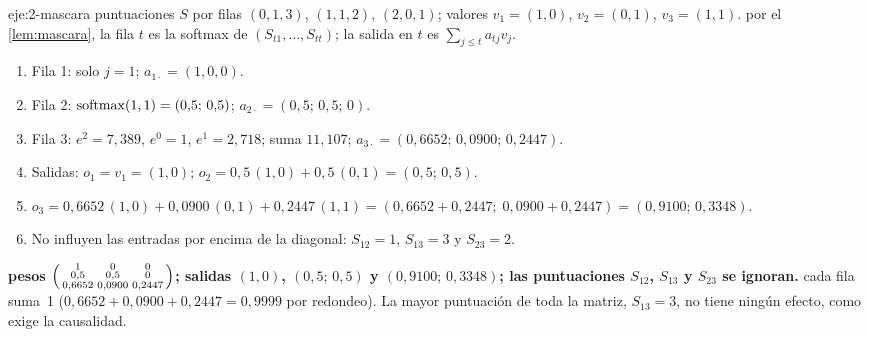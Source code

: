 \begin{solucion}{eje:2-mascara}
\datos puntuaciones $S$ por filas $(0,1,3)$, $(1,1,2)$, $(2,0,1)$; valores $v_1=(1,0)$, $v_2=(0,1)$, $v_3=(1,1)$.
\planteamiento por el \cref{lem:mascara}, la fila $t$ es la softmax de $(S_{t1},\dots,S_{tt})$; la salida en $t$ es $\sum_{j\le t}a_{tj}v_j$.
\pasos
\begin{enumerate}[label=\arabic*.]
  \item Fila 1: solo $j=1$; $a_{1\cdot}=(1,0,0)$.
  \item Fila 2: $\operatorname{softmax}(1,1)=(0{,}5;\allowbreak\,0{,}5)$; $a_{2\cdot}=(0{,}5;\allowbreak\,0{,}5;\allowbreak\,0)$.
  \item Fila 3: $e^{2}=7{,}389$, $e^{0}=1$, $e^{1}=2{,}718$; suma $11{,}107$; $a_{3\cdot}=(0{,}6652;\allowbreak\,0{,}0900;\allowbreak\,0{,}2447)$.
  \item Salidas: $o_1=v_1=(1,0)$; $o_2=0{,}5\,(1,0)+0{,}5\,(0,1)=(0{,}5;\allowbreak\,0{,}5)$.
  \item $o_3=0{,}6652\,(1,0)+0{,}0900\,(0,1)+0{,}2447\,(1,1)=(0{,}6652+0{,}2447;\;0{,}0900+0{,}2447)=(0{,}9100;\allowbreak\,0{,}3348)$.
  \item No influyen las entradas por encima de la diagonal: $S_{12}=1$, $S_{13}=3$ y $S_{23}=2$.
\end{enumerate}
\resultado \textbf{pesos $\begin{psmallmatrix}1&0&0\\0{,}5&0{,}5&0\\0{,}6652&0{,}0900&0{,}2447\end{psmallmatrix}$; salidas $(1,0)$, $(0{,}5;\allowbreak\,0{,}5)$ y $(0{,}9100;\allowbreak\,0{,}3348)$; las puntuaciones $S_{12}$, $S_{13}$ y $S_{23}$ se ignoran.}
\comprobacion cada fila suma~1 ($0{,}6652+0{,}0900+0{,}2447=0{,}9999$ por redondeo). La mayor puntuación de toda la matriz, $S_{13}=3$, no tiene ningún efecto, como exige la causalidad.
\end{solucion}

